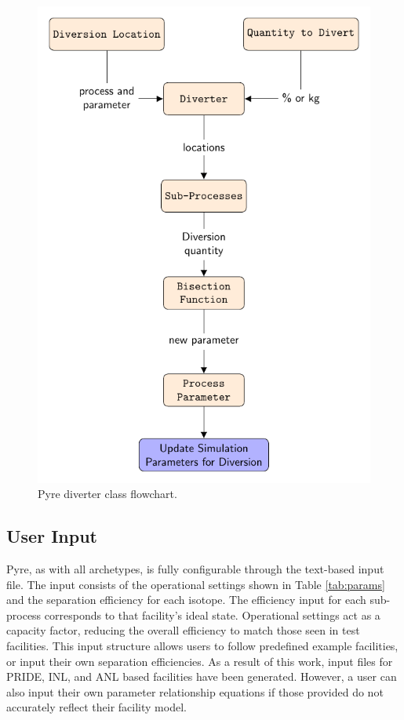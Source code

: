 \begin{figure}[h]
	\centering
	\includegraphics[width=0.65\linewidth]{images/divertflow}
	\caption{Pyre diverter class flowchart.}
	\label{fig:divflow}
\end{figure}

\subsection{User Input}
Pyre, as with all \Cyclus archetypes, is fully configurable through the text-based input file. The input consists of the operational settings shown in Table \ref{tab:params}
and the separation efficiency for each isotope. The efficiency input for each sub-process corresponds to that facility's ideal state. Operational settings act as a capacity factor,
reducing the overall efficiency to match those seen in test facilities. This input structure allows users to follow predefined example facilities, or input their own separation
efficiencies. As a result of this work, input files for PRIDE, INL, and ANL based facilities have been generated. However, a user can also input their own parameter relationship equations
if those provided do not accurately reflect their facility model.